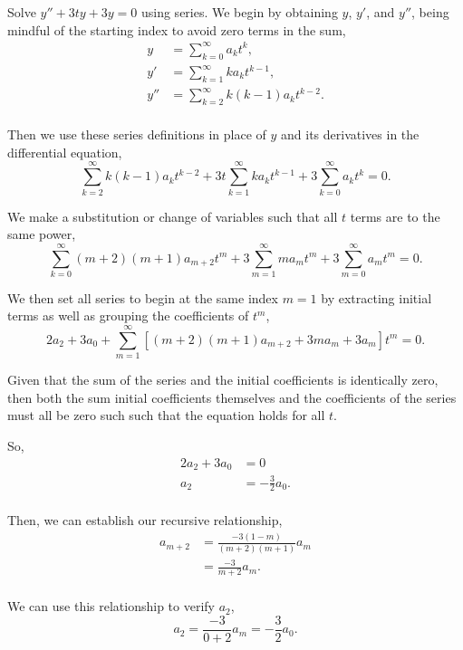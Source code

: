 \documentclass[../hw8]{subfiles}
\begin{document}
Solve $y''+3ty+3y=0$ using series.
We begin by obtaining $y$, $y'$, and $y''$, being mindful of the starting index to avoid zero terms in the sum,
\begin{align*}
    y&=\sum\limits_{k=0}^{\infty}a_k t^k, \\
    y'&=\sum\limits_{k=1}^{\infty}k a_k t^{k-1}, \\
    y''&=\sum\limits_{k=2}^{\infty}k(k-1)a_k t^{k-2}. \\
\end{align*}

Then we use these series definitions in place of $y$ and its derivatives in the differential equation,
\[\sum\limits_{k=2}^{\infty}k(k-1)a_k t^{k-2}+3t\sum\limits_{k=1}^{\infty}k a_k t^{k-1}+3\sum\limits_{k=0}^{\infty}a_k t^k=0.\]

We make a substitution or change of variables such that all $t$ terms are to the same power,
\[\sum\limits_{k=0}^{\infty}(m+2)(m+1)a_{m+2} t^m+3\sum\limits_{m=1}^{\infty}ma_m t^m+3\sum\limits_{m=0}^{\infty}a_m t^m=0.\]

We then set all series to begin at the same index $m=1$ by extracting initial terms as well as grouping the coefficients of $t^m$,
\[2a_2+3a_0+\sum\limits_{m=1}^{\infty}\left[ (m+2)(m+1)a_{m+2}+3ma_m+3a_m \right]t^m=0.\]

Given that the sum of the series and the initial coefficients is identically zero, then both the sum initial coefficients themselves and the coefficients of the series must all be zero such such that the equation holds for all $t$.

So, 
\begin{align*}
    2a_2+3a_0&=0\\
    a_2&=-\frac{3}{2}a_0.\\
\end{align*}

Then, we can establish our recursive relationship,
\begin{align*}
    a_{m+2}&=\frac{-3(1-m)}{(m+2)(m+1)}a_m\\
    &=\frac{-3}{m+2}a_m.\\
\end{align*}

We can use this relationship to verify $a_2$,
\[a_2=\frac{-3}{0+2}a_m=-\frac{3}{2}a_0.\]
\end{document}
